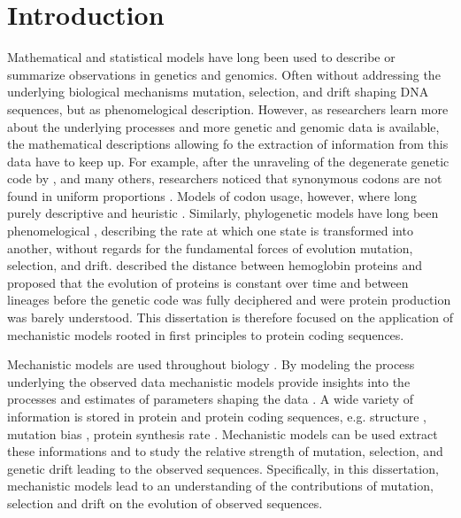 \chapter{Introduction} 
\label{ch:introduction}

Mathematical and statistical models have long been used to describe or summarize observations in genetics and genomics.
Often without addressing the underlying biological mechanisms mutation, selection, and drift shaping DNA sequences, but as phenomelogical description.
However, as researchers learn more about the underlying processes and more genetic and genomic data is available, the mathematical descriptions allowing fo the extraction of information from this data have to keep up.
For example, after the unraveling of the degenerate genetic code by \citet{MatthaeiAndNirenberg1961,NirenbergAndMatthaei1961,Maxwell1962,LederAndNirenberg1964}, and many others, researchers noticed that synonymous codons are not found in uniform proportions \citep{fitch1976,grantham1980,ikemura1981,grantham1981,sharp1988}.
Models of codon usage, however, where long purely descriptive and heuristic \citep{ikemura1981,BennetzenAndHall1982,sharp1987,wright1990}.
Similarly, phylogenetic models have long been phenomelogical \citep{JukesAndCantor1969,Dayhoff1978,Kimura1980,felsenstein1981,Altschul1991}, describing the rate at which one state is transformed into another, without regards for the fundamental forces of evolution mutation, selection, and drift.
\citet{ZuckerkandlAndPauling1962} described the distance between hemoglobin proteins and proposed that the evolution of proteins is constant over time and between lineages before the genetic code was fully deciphered and were protein production was barely understood.
This dissertation is therefore focused on the application of mechanistic models rooted in first principles to protein coding sequences.

Mechanistic models are used throughout biology \citep{GoldmanAndYang1994,loreau1998,DavisAndPelsor2001,adf2007,McGill2007}.
By modeling the process underlying the observed data mechanistic models provide insights into the processes and estimates of parameters shaping the data \citep{Liberles2013}.
A wide variety of information is stored in protein and protein coding sequences, e.g. structure \citep{anfinsen1973}, mutation bias \citep{ShahAndGilchrist2011, gilchrist2015}, protein synthesis rate \citep{gilchrist2007,gilchrist2015}. 
Mechanistic models can be used extract these informations and to study the relative strength of mutation, selection, and genetic drift leading to the observed sequences.
Specifically, in this dissertation, mechanistic models lead to an understanding of the contributions of mutation, selection and drift on the evolution of observed sequences.

